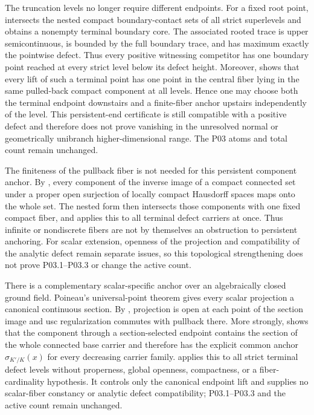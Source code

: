 The truncation levels no longer require different endpoints.
For a fixed root point,
 intersects the nested
compact boundary-contact sets of all strict superlevels and obtains a
nonempty terminal boundary core.  The associated rooted trace is upper
semicontinuous, is bounded by the full boundary trace, and has maximum
exactly the pointwise defect.  Thus every positive witnessing competitor has
one boundary point reached at every strict level below its defect height.
Moreover,
 shows that every lift
of such a terminal point has one point in the central fiber lying in the
same pulled-back compact component at all levels.  Hence one may choose
both the terminal endpoint downstairs and a finite-fiber anchor upstairs
independently of the level.  This persistent-end certificate is still
compatible with a positive defect and therefore does not prove vanishing in
the unresolved normal or geometrically unibranch higher-dimensional range.
The P03 atoms and total count remain unchanged.

The finiteness of the pullback fiber is not needed for this persistent
component anchor.  By
, every component of the
inverse image of a compact connected set under a proper open surjection of
locally compact Hausdorff spaces maps onto the whole set.  The nested form
 then intersects those
components with one fixed compact fiber, and
 applies this to all
terminal defect carriers at once.  Thus infinite or nondiscrete fibers are
not by themselves an obstruction to persistent anchoring.  For scalar
extension, openness of the projection and compatibility of the analytic
defect remain separate issues, so this topological strengthening does not
prove P03.1--P03.3 or change the active count.

There is a complementary scalar-specific anchor over an algebraically closed
ground field.  Poineau's universal-point theorem gives every scalar projection
a canonical continuous section.  By
, projection is open at
each point of the section image and usc regularization commutes with pullback
there.  More strongly,
 shows that the
component through a section-selected endpoint contains the section of the
whole connected base carrier and therefore has the explicit common anchor
\(\sigma_{K'/K}(x)\) for every decreasing carrier family.
 applies this to all
strict terminal defect levels without properness, global openness, compactness,
or a fiber-cardinality hypothesis.  It controls only the canonical endpoint
lift and supplies no scalar-fiber constancy or analytic defect compatibility;
P03.1--P03.3 and the active count remain unchanged.

